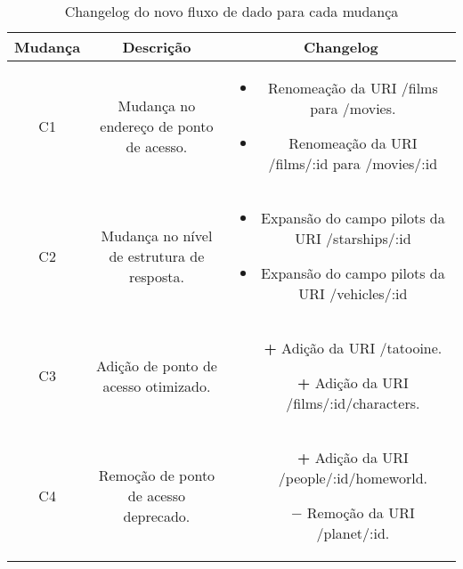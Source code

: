 \begin{table}[H]
  \centering
  \begin{tabular}{|c|c|c|}
    \hline
    Mudança & Descrição & Changelog \\
    \hline
    C1 & Mudança no endereço de ponto de acesso. & \begin{minipage}[t]{0.8\textwidth}
      \begin{itemize}
        \item Renomeação da URI /films para /movies.
        \item Renomeação da URI /films/:id para /movies/:id
      \end{itemize}
    \end{minipage} \\
    \hline
    C2 & Mudança no nível de estrutura de resposta. & \begin{minipage}[t]{0.8\textwidth}
      \begin{itemize}
        \item Expansão do campo pilots da URI /starships/:id
        \item Expansão do campo pilots da URI /vehicles/:id
      \end{itemize}
    \end{minipage} \\
    \hline
    C3 & Adição de ponto de acesso otimizado. & \begin{minipage}[t]{0.8\textwidth}
      \begin{itemize}
        \item[\textbf{+}] Adição da URI /tatooine.
        \item[\textbf{+}] Adição da URI /films/:id/characters.
      \end{itemize}
    \end{minipage} \\
    \hline
    C4 & Remoção de ponto de acesso deprecado. & \begin{minipage}[t]{0.8\textwidth}
      \begin{itemize}
        \item[\textbf{+}] Adição da URI /people/:id/homeworld.
        \item[\textbf{$-$}] Remoção da URI /planet/:id.
      \end{itemize}
    \end{minipage} \\
    \hline
  \end{tabular}
  \caption{Changelog do novo fluxo de dado para cada mudança}
\end{table}


